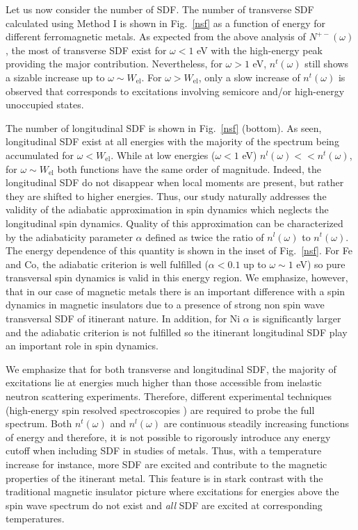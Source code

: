 Let us now consider the number of SDF. The number of transverse SDF calculated using Method I is shown in Fig.~\ref{nsf} as a function of energy for different ferromagnetic metals. As expected from the above analysis of $N^{+-}(\omega)$, the most of transverse SDF exist for $\omega < 1$ eV with the high-energy peak providing the major contribution. Nevertheless, for $\omega > 1$ eV, $n^t(\omega)$ still shows a sizable increase up to $\omega\sim W_{\text{el}}$. For $\omega>W_{\text{el}}$, only a slow increase of $n^t(\omega)$ is observed that corresponds to excitations involving semicore and/or high-energy unoccupied states.

The number of longitudinal SDF is shown in Fig.~\ref{nsf} (bottom). As seen, longitudinal SDF exist at all energies with the majority of the spectrum being accumulated for $\omega<W_{\text{el}}$. While at low energies ($\omega<1$ eV) $n^l(\omega)<<n^t(\omega)$, for $\omega\sim W_{\text{el}}$ both functions have the same order of magnitude. Indeed, the longitudinal SDF do not disappear when local moments are present, but rather they are shifted to higher energies. Thus, our study naturally addresses the validity of the adiabatic approximation\citep{Antropov2} in spin dynamics which neglects the longitudinal spin dynamics. Quality of this approximation can be characterized by the adiabaticity parameter $\alpha$ defined as twice the ratio of $n^l(\omega)$ to $n^t(\omega)$. The energy dependence of this quantity is shown in the inset of Fig.~\ref{nsf}. For Fe and Co, the adiabatic criterion \citep{Antropov2} is well fulfilled ($\alpha<0.1$ up to $\omega\sim 1$ eV) so pure transversal spin dynamics is valid in this energy region. We emphasize, however, that in our case of magnetic metals there is an important difference with a spin dynamics in magnetic insulators due to a presence of strong non spin wave transversal SDF of itinerant nature. In addition, for Ni $\alpha$ is significantly larger and the adiabatic criterion is not fulfilled so the itinerant longitudinal SDF play an important role in spin dynamics.


We emphasize that for both transverse and longitudinal SDF, the majority of excitations lie at energies much higher than those accessible from inelastic neutron scattering experiments. Therefore, different experimental techniques (high-energy spin resolved spectroscopies \citep{experiment}) are required to probe the full spectrum. Both $n^t(\omega)$ and $n^l(\omega)$ are continuous steadily increasing functions of energy and therefore, it is not possible to rigorously introduce any energy cutoff when including SDF in studies of metals. Thus, with a temperature increase for instance, more SDF are excited and contribute to the magnetic properties of the itinerant metal. This feature is in stark contrast with the traditional magnetic insulator picture where excitations for energies above the spin wave spectrum do not exist and \emph{all} SDF are excited at corresponding temperatures.
\FloatBarrier


